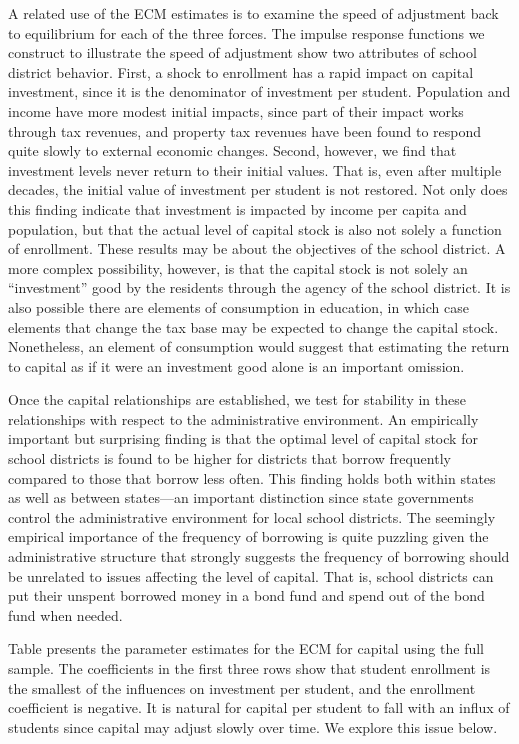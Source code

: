 A related use of the ECM estimates is to examine the speed of adjustment back to equilibrium for each of the three forces. The impulse response functions we construct to illustrate the speed of adjustment show two attributes of school district behavior. First, a shock to enrollment has a rapid impact on capital investment, since it is the denominator of investment per student. Population and income have more modest initial impacts, since part of their impact works through tax revenues, and property tax revenues have been found to respond quite slowly to external economic changes. Second, however, we find that investment levels never return to their initial values. That is, even after multiple decades, the initial value of investment per student is not restored. Not only does this finding indicate that investment is impacted by income per capita and population, but that the actual level of capital stock is also not solely a function of enrollment. These results may be about the objectives of the school district. A more complex possibility, however, is that the capital stock is not solely an “investment” good by the residents through the agency of the school district. It is also possible there are elements of consumption in education, in which case elements that change the tax base may be expected to change the capital stock. Nonetheless, an element of consumption would suggest that estimating the return to capital as if it were an investment good alone is an important omission.

Once the capital relationships are established, we test for stability in these relationships with respect to the administrative environment. An empirically important but surprising finding is that the optimal level of capital stock for school districts is found to be higher for districts that borrow frequently compared to those that borrow less often. This finding holds both within states as well as between states—an important distinction since state governments control the administrative environment for local school districts. The seemingly empirical importance of the frequency of borrowing is quite puzzling given the administrative structure that strongly suggests the frequency of borrowing should be unrelated to issues affecting the level of capital. That is, school districts can put their unspent borrowed money in a bond fund and spend out of the bond fund when needed. 

Table presents the parameter estimates for the ECM for capital using the full sample. The coefficients in the first three rows show that student enrollment is the smallest of the influences on investment per student, and the enrollment coefficient is negative. It is natural for capital per student to fall with an influx of students since capital may adjust slowly over time. We explore this issue below. 
 
